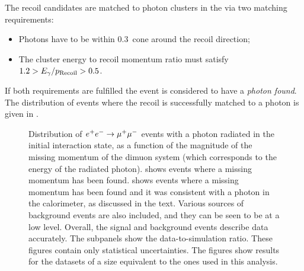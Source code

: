The recoil candidates are matched to photon clusters in the \ECL via two matching requirements:
\begin{itemize}
    \item Photons have to be within 0.3~\rad cone around the recoil direction;
    \item The cluster energy to recoil momentum ratio must satisfy $1.2>E_{\gamma}/{p_{\mathrm{Recoil}}}>0.5$.
\end{itemize}
If both requirements are fulfilled the event is considered to have a \textit{photon found}.
The distribution of events where the recoil is successfully matched to a photon is given in .
\begin{figure}[htbp!]
    \centering
    \caption{\label{fig:normalisation_data_mc} Distribution of $e^+e^-\rightarrow\mu^+\mu^-$ events with a photon radiated in the initial interaction state, as a function of the magnitude of the missing momentum of the dimuon system (which corresponds to the energy of the radiated photon).
     shows events where a missing momentum has been found.
     shows events where a missing momentum has been found and it was consistent with a photon in the calorimeter, as discussed in the text.
    Various sources of background events are also included, and they can be seen to be at a low level.
    Overall, the signal and background events describe data accurately.
    The subpanels show the data-to-simulation ratio.
    These figures contain only statistical uncertainties.
    The figures show results for the datasets of a size equivalent to the ones used in this analysis.
    }
\end{figure}

